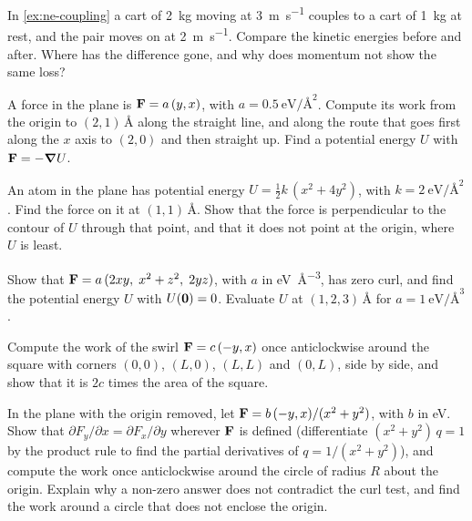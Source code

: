 \begin{exercise}[coupling]
\label{ex:en-coupling}
In \cref{ex:ne-coupling} a cart of \SI{2}{\kilogram} moving at
\SI{3}{\metre\per\second} couples to a cart of \SI{1}{\kilogram} at rest,
and the pair moves on at \SI{2}{\metre\per\second}. Compare the kinetic
energies before and after. Where has the difference gone, and why does
momentum not show the same loss?
\end{exercise}

\begin{exercise}
\label{ex:en-routes}
A force in the plane is $\bm{\mathrm{F}} = a\,(y, x)$, with $a =
\SI{0.5}{\electronvolt\per\angstrom\squared}$. Compute its work from the
origin to $(2, 1)$\,\si{\angstrom} along the straight line, and along
the route that goes first along the $x$ axis to $(2, 0)$ and then
straight up. Find a potential energy $U$ with $\bm{\mathrm{F}} = -\bm{\nabla} U$.
\end{exercise}

\begin{exercise}
\label{ex:en-ellipse}
An atom in the plane has potential energy $U = \frac12 k\,(x^2 + 4y^2)$,
with $k = \SI{2}{\electronvolt\per\angstrom\squared}$. Find the force on
it at $(1, 1)$\,\si{\angstrom}. Show that the force is perpendicular to
the contour of $U$ through that point, and that it does not point at the
origin, where $U$ is least.
\end{exercise}

\begin{exercise}
\label{ex:en-curl}
Show that $\bm{\mathrm{F}} = a\,(2xy,\; x^2 + z^2,\; 2yz)$, with $a$ in
\si{\electronvolt\per\angstrom\cubed}, has zero curl, and find the
potential energy $U$ with $U(\bm{\mathrm{0}}) = 0$. Evaluate $U$ at $(1, 2,
3)$\,\si{\angstrom} for $a = \SI{1}{\electronvolt\per\angstrom\cubed}$.
\end{exercise}

\begin{exercise}
\label{ex:en-square}
Compute the work of the swirl $\bm{\mathrm{F}} = c\,(-y, x)$ once anticlockwise
around the square with corners $(0, 0)$, $(L, 0)$, $(L, L)$ and $(0, L)$,
side by side, and show that it is $2c$ times the area of the square.
\end{exercise}

\begin{exercise}
\label{ex:en-vortex}
In the plane with the origin removed, let $\bm{\mathrm{F}} = b\,(-y, x)/(x^2 +
y^2)$, with $b$ in \si{\electronvolt}. Show that $\partial F_y/\partial x
= \partial F_x/\partial y$ wherever $\bm{\mathrm{F}}$ is defined (differentiate
$(x^2 + y^2)\,q = 1$ by the product rule to find the partial derivatives
of $q = 1/(x^2 + y^2)$), and compute the
work once anticlockwise around the circle of radius $R$ about the origin.
Explain why a non-zero answer does not contradict the curl test, and find
the work around a circle that does not enclose the origin.
\end{exercise}

